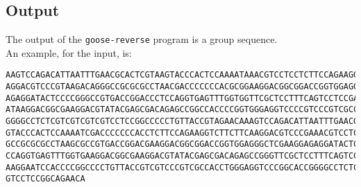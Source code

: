 \subsection*{Output}
The output of the \texttt{goose-reverse} program is a group sequence.\\
An example, for the input, is:
\begin{lstlisting}
AAGTCCAGACATTAATTTGAACGCACTCGTAAGTACCCACTCCAAAATAAACGTCCTCCTCTTCCAGAAGGTCTTCTTCA
AGGACGTCCCGTAAGACAGGGCCGCGCGCCTAACGACCCCCCCACGCGGAAGGACGGCGGACCGGTGGAGGGCTCGAAGG
AGAGGATACTCCCCGGGCCGTGACCGGACCCTCCAGGTGAGTTTGGTGGTTCGCTCCTTTCAGTCCTCCGACGAAAAGGA
ATAAGGACGGCGAAGGACGTATACGAGCGACAGAGCCGGCCACCCCGGTGGGAGGTCCCCGTCCCGTCGCCACCGGCACC
GGGGCCTCTCGTCGTCGTCGTCCTCCGGCCCCCTGTTACCGTAGAACAAAGTCCAGACATTAATTTGAACGCACTCGTAA
GTACCCACTCCAAAATCGACCCCCCCACCTCTTCCAGAAGGTCTTCTTCAAGGACGTCCCGAAACGTCCTCTAAGACAGG
GCCGCGCGCCTAAGCGCCGTGACCGGACGAAGGACGGCGGACCGGTGGAGGGCTCGAAGGAGAGGATACTCCCCGGGCCT
CCAGGTGAGTTTGGTGAAGGACGGCGAAGGACGTATACGAGCGACAGAGCCGGGTTCGCTCCTTTCAGTCCTCCGACGAA
AAGGAATCCACCCCGGCCCCTGTTACCGTCGTCCCGTCGCCACCTGGGAGGTCCCGGCACCGGGGCCTCTCGTCGTCGTC
GTCCTCCGGCAGAACA
\end{lstlisting}